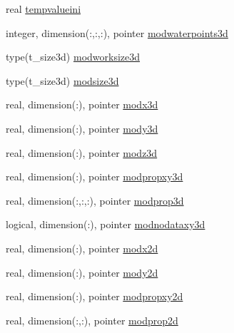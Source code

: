 \begin{DoxyCompactItemize}
real \mbox{\hyperlink{structmoduledelft3d__2__mohid_1_1t__delft3d__2__mohid_a1868a81fc19fbfe0f40573ddd428ba8c}{tempvalueini}}
\item 
integer, dimension(\+:,\+:,\+:), pointer \mbox{\hyperlink{structmoduledelft3d__2__mohid_1_1t__delft3d__2__mohid_ac197e832303fe011b985d0dbfe332001}{modwaterpoints3d}}
\item 
type(t\+\_\+size3d) \mbox{\hyperlink{structmoduledelft3d__2__mohid_1_1t__delft3d__2__mohid_acbbecdda8e7f4c352729077898416bf4}{modworksize3d}}
\item 
type(t\+\_\+size3d) \mbox{\hyperlink{structmoduledelft3d__2__mohid_1_1t__delft3d__2__mohid_a0ef649fe15503c6b0169d6517a3a4377}{modsize3d}}
\item 
real, dimension(\+:), pointer \mbox{\hyperlink{structmoduledelft3d__2__mohid_1_1t__delft3d__2__mohid_a7cd8bcd85386d3ef9b5d67d5488c92d0}{modx3d}}
\item 
real, dimension(\+:), pointer \mbox{\hyperlink{structmoduledelft3d__2__mohid_1_1t__delft3d__2__mohid_affdb28d9ac277eca3839db29738dff23}{mody3d}}
\item 
real, dimension(\+:), pointer \mbox{\hyperlink{structmoduledelft3d__2__mohid_1_1t__delft3d__2__mohid_abcff7484830dccd02bba6293636c341b}{modz3d}}
\item 
real, dimension(\+:), pointer \mbox{\hyperlink{structmoduledelft3d__2__mohid_1_1t__delft3d__2__mohid_a69c0e718cbee218960d9c60fe614782e}{modpropxy3d}}
\item 
real, dimension(\+:,\+:,\+:), pointer \mbox{\hyperlink{structmoduledelft3d__2__mohid_1_1t__delft3d__2__mohid_aed5625cebd0e8455b388627a043409e9}{modprop3d}}
\item 
logical, dimension(\+:), pointer \mbox{\hyperlink{structmoduledelft3d__2__mohid_1_1t__delft3d__2__mohid_abae3a41bd4a500d461977cdc703e0f52}{modnodataxy3d}}
\item 
real, dimension(\+:), pointer \mbox{\hyperlink{structmoduledelft3d__2__mohid_1_1t__delft3d__2__mohid_a05536f1f13364d47dad4ea5a23ee3831}{modx2d}}
\item 
real, dimension(\+:), pointer \mbox{\hyperlink{structmoduledelft3d__2__mohid_1_1t__delft3d__2__mohid_aff61a35df7733da22a02cc0313ee0b4e}{mody2d}}
\item 
real, dimension(\+:), pointer \mbox{\hyperlink{structmoduledelft3d__2__mohid_1_1t__delft3d__2__mohid_ab67e559fec15e647697fa6790ff4794e}{modpropxy2d}}
\item 
real, dimension(\+:,\+:), pointer \mbox{\hyperlink{structmoduledelft3d__2__mohid_1_1t__delft3d__2__mohid_ac7933e60693ec425698ef2a2416779c1}{modprop2d}}

\end{DoxyCompactItemize}
